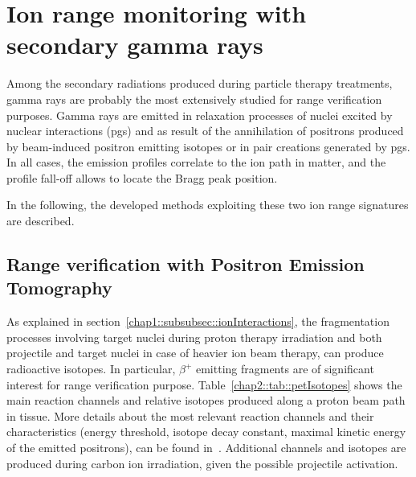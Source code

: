 \section{Ion range monitoring with secondary gamma rays}\label{chap2::sec::GammaIonRange}

Among the secondary radiations produced during particle therapy treatments, gamma rays are probably the most extensively studied for range verification purposes. Gamma rays are emitted in relaxation processes of nuclei excited by nuclear interactions (\glspl{pg}) and as result of the annihilation of positrons produced by beam-induced positron emitting isotopes or in pair creations generated by \glspl{pg}. In all cases, the emission profiles correlate to the ion path in matter, and the profile fall-off allows to locate the Bragg peak position. 

In the following, the developed methods exploiting these two ion range signatures are described.

\subsection{Range verification with Positron Emission Tomography}\label{chap2::subsec::PETrangeVerif}

As explained in section~\ref{chap1::subsubsec::ionInteractions}, the fragmentation processes involving target nuclei during proton therapy irradiation and both projectile and target nuclei in case of heavier ion beam therapy, can produce radioactive isotopes. In particular, $\beta^+$ emitting fragments are of significant interest for range verification purpose. Table~\ref{chap2::tab::petIsotopes} shows the main reaction channels and relative isotopes produced along a proton beam path in tissue. More details about the most relevant reaction channels and their characteristics (energy threshold, isotope decay constant, maximal kinetic energy of the emitted positrons), can be found in~\cite{Oelfke1996}. Additional channels and isotopes are produced during carbon ion irradiation, given the possible projectile activation. 

